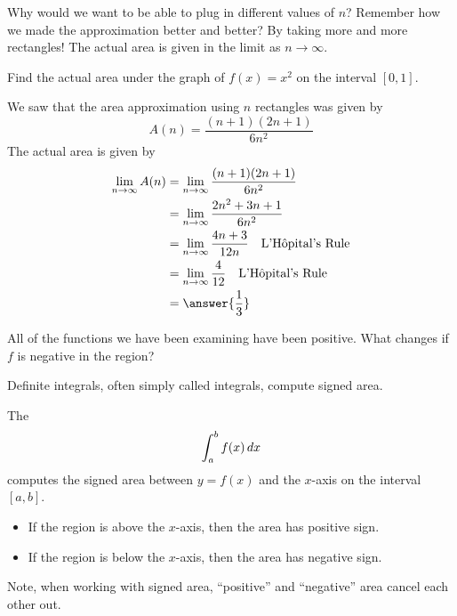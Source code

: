 \documentclass{ximera}
\begin{document}
Why would we want to be able to plug in different values of $n$?  Remember how we made the approximation better and better?  By taking
more and more rectangles!  The actual area is given in the limit as $n\to \infty$.

\begin{example}
	Find the actual area under the graph of $f(x)=x^2$ on the interval $[0,1]$.
	\begin{explanation}
		We saw that the area approximation using $n$ rectangles was given by
		\[ A(n) = \frac{(n+1)(2n+1)}{6n^2} \]
		The actual area is given by
		\begin{align*}
			\lim_{n\to\infty} A(n) &= \lim_{n\to\infty} \frac{(n+1)(2n+1)}{6n^2}\\
				&= \lim_{n\to\infty} \frac{2n^2+3n+1}{6n^2} \\
				&= \lim_{n\to\infty} \frac{4n+3}{12n} \quad \text{L'H\^opital's Rule}\\
				&= \lim_{n\to\infty} \frac{4}{12} \quad \text{L'H\^opital's Rule}\\
				&= \answer{\frac{1}{3}}
		\end{align*}
	\end{explanation}
\end{example}

All of the functions we have been examining have been positive.  What changes if $f$ is negative in the region?



Definite integrals, often simply called integrals, compute signed area. 

\begin{definition}
The 
\[
\int_a^b f(x) \mathop{}\!d x
\]
computes the signed area between $y=f(x)$ and the $x$-axis on the
interval $[a,b]$.
\begin{itemize}
  \item If the region is above the $x$-axis, then the area has
    positive sign.
  \item If the region is below the $x$-axis, then the area has
    negative sign.
\end{itemize}
Note, when working with signed area, ``positive'' and ``negative''
area cancel each other out.
\end{definition}
\end{document}
